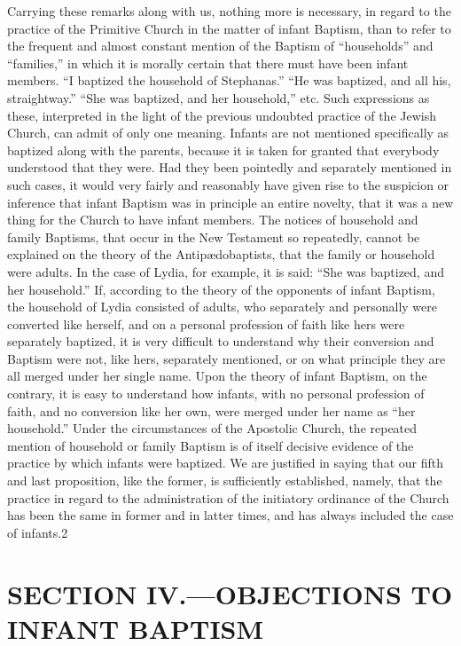 \documentclass[]{book}
\begin{document}
Carrying these remarks along with us, nothing more is necessary, in regard to the practice of the Primitive Church in the matter of infant Baptism, than to refer to the frequent and almost constant mention of the Baptism of ``households'' and ``families,'' in which it is morally certain that there must have been infant members. ``I baptized the household of Stephanas.'' ``He was baptized, and all his, straightway.'' ``She was baptized, and her household,'' etc. Such expressions as these, interpreted in the light of the previous undoubted practice of the Jewish Church, can admit of only one meaning. Infants are not mentioned specifically as baptized along with the parents, because it is taken for granted that everybody understood that they were. Had they been pointedly and separately mentioned in such cases, it would very fairly and reasonably have given rise to the suspicion or inference that infant Baptism was in principle an entire novelty, that it was a new thing for the Church to have infant members. The notices of household and family Baptisms, that occur in the New Testament so repeatedly, cannot be explained on the theory of the Antipædobaptists, that the family or household were adults. In the case of Lydia, for example, it is said: ``She was baptized, and her household.'' If, according to the theory of the opponents of infant Baptism, the household of Lydia consisted of adults, who separately and personally were converted like herself, and on a personal profession of faith like hers were separately baptized, it is very difficult to understand why their conversion and Baptism were not, like hers, separately mentioned, or on what principle they are all merged under her single name. Upon the theory of infant Baptism, on the contrary, it is easy to understand how infants, with no personal profession of faith, and no conversion like her own, were merged under her name as ``her household.'' Under the circumstances of the Apostolic Church, the repeated mention of household or family Baptism is of itself decisive evidence of the practice by which infants were baptized. We are justified in saying that our fifth and last proposition, like the former, is sufficiently established, namely, that the practice in regard to the administration of the initiatory ordinance of the Church has been the same in former and in latter times, and has always included the case of infants.2

\hypertarget{section-iv.objections-to-infant-baptism}{%
\section{SECTION IV.---OBJECTIONS TO INFANT BAPTISM}\label{section-iv.objections-to-infant-baptism}}
\end{document}
